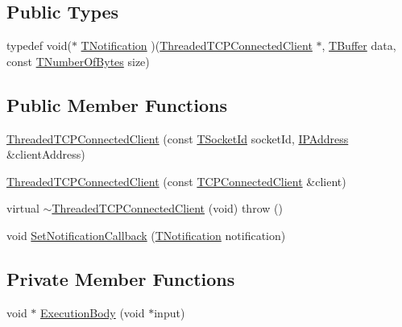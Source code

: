 \subsection*{Public Types}
\begin{DoxyCompactItemize}
\item 
typedef void($\ast$ \hyperlink{class_threaded_t_c_p_connected_client_a0b2385571a0d98483ddc7ca84bc82cf4}{T\-Notification} )(\hyperlink{class_threaded_t_c_p_connected_client}{Threaded\-T\-C\-P\-Connected\-Client} $\ast$, \hyperlink{class_socket_base_a1557d64029a25c20b4c306b80efcc143}{T\-Buffer} data, const \hyperlink{class_socket_base_ac414903631491453b96e71c06c2c2e72}{T\-Number\-Of\-Bytes} size)
\end{DoxyCompactItemize}
\subsection*{Public Member Functions}
\begin{DoxyCompactItemize}
\item 
\hyperlink{class_threaded_t_c_p_connected_client_ae91cbb1c8769f9495d1f3a37258a4307}{Threaded\-T\-C\-P\-Connected\-Client} (const \hyperlink{class_socket_base_aad53265037e46768af4d6a0c2ebed277}{T\-Socket\-Id} socket\-Id, \hyperlink{class_i_p_address}{I\-P\-Address} \&client\-Address)
\item 
\hyperlink{class_threaded_t_c_p_connected_client_a2841c53cd1cbc21c2a60aad8aceb7bbe}{Threaded\-T\-C\-P\-Connected\-Client} (const \hyperlink{class_t_c_p_connected_client}{T\-C\-P\-Connected\-Client} \&client)
\item 
virtual \hyperlink{class_threaded_t_c_p_connected_client_a0b748a1d80ddbde12b424e93807ef298}{$\sim$\-Threaded\-T\-C\-P\-Connected\-Client} (void)  throw ()
\item 
void \hyperlink{class_threaded_t_c_p_connected_client_ae8f981925319c228443e0ef78ef0ae67}{Set\-Notification\-Callback} (\hyperlink{class_threaded_t_c_p_connected_client_a0b2385571a0d98483ddc7ca84bc82cf4}{T\-Notification} notification)
\end{DoxyCompactItemize}
\subsection*{Private Member Functions}
\begin{DoxyCompactItemize}
\item 
void $\ast$ \hyperlink{class_threaded_t_c_p_connected_client_a019445fcc5fc83ad40583d3772c88a8b}{Execution\-Body} (void $\ast$input)
\end{DoxyCompactItemize}
